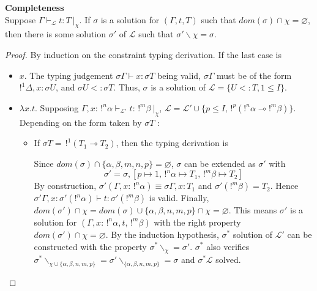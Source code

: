 \begin{prop}{\bf Completeness} \\
	Suppose $\Gamma \vdash_\mathcal{L} t : T ~|_\chi$. If $\sigma$ is a solution for $(\Gamma, t, T)$ such that
	$dom(\sigma) \cap \chi = \varnothing$, then there 	is some solution $\sigma'$ of $\mathcal{L}$ such that
	$\sigma' \backslash \chi = \sigma$.
	
	\begin{proof}
		By induction on the constraint typing derivation. If the last case is
		\begin{itemize}
		\item $x$. The typing judgement $\sigma \Gamma \vdash x : \sigma T$ being valid, $\sigma \Gamma$ must be of the form
			$!^1 \Delta, x : \sigma U$, and $\sigma U <: \sigma T$. Thus, $\sigma$ is a solution of $\mathcal{L} = \{ U <: T, 1 \le I \}$.
			
		\item $\lambda x.t$. Supposing $\Gamma, x : \,!^n\alpha \vdash_\mathcal{L'} t : \,!^m\beta ~|_\chi$, $\mathcal{L} = \mathcal{L'} \cup
			\{ p \le I, \,!^p(!^n\alpha \multimap !^m\beta) \}$.
			Depending on the form taken by $\sigma T$ :
			\begin{itemize}
			\item If $\sigma T = \,!^1 (T_1 \multimap T_2)$, then the typing derivation is
				\begin{prooftree}
				\end{prooftree}
				Since $dom(\sigma) \cap \{\alpha, \beta, m, n, p\} = \varnothing$, $\sigma$ can be extended as $\sigma'$ with
					$$\sigma' = \sigma, [p \mapsto 1, \,!^n\alpha \mapsto T_1, \,!^m\beta \mapsto T_2]$$
				By construction, $\sigma' (\Gamma, x : \,!^n\alpha) \equiv \sigma\Gamma, x : T_1$ and $\sigma' (!^m \beta) = T_2$. Hence
				$\sigma' \Gamma, x : \sigma'(!^n\alpha) \vdash t : \sigma'(!^m \beta)$ is valid. Finally,
				$dom(\sigma') \cap \chi = dom(\sigma) \cup \{\alpha, \beta, n, m, p\} \cap \chi = \varnothing$.
				This means $\sigma'$ is a solution for $(\Gamma,x : \,!^n\alpha, t, \,!^m\beta)$ with the right property
				$dom(\sigma') \cap \chi = \varnothing$. By the induction hypothesis, $\sigma^*$ solution of $\mathcal{L'}$ can be constructed
				with the property $\sigma^* \backslash_\chi = \sigma'$.
				$\sigma^*$ also verifies $\sigma^*\backslash_{\chi \cup \{\alpha, \beta, n, m , p\}} =
				\sigma' \backslash_{\{\alpha, \beta, n, m, p \}} = \sigma$ and $\sigma^* \mathcal{L}$ solved. \\
					

\end{itemize}
\end{itemize}
\end{proof}
\end{prop}

